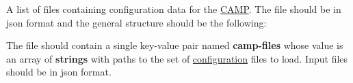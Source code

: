 A list of files containing configuration data for the \mbox{\hyperlink{index}{CAMP}}. The file should be in {\ttfamily json} format and the general structure should be the following\+:


\begin{DoxyCode}{0}
\DoxyCodeLine{\{ "{}camp-\/files"{} : [}
\DoxyCodeLine{]\}}

\end{DoxyCode}
 The file should contain a single key-\/value pair named {\bfseries{camp-\/files}} whose value is an array of {\bfseries{strings}} with paths to the set of \mbox{\hyperlink{input_format_camp_config}{configuration}} files to load. Input files should be in {\ttfamily json} format. 